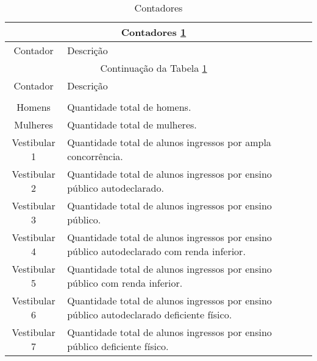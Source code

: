 \documentclass[cic,tc]{iiufrgs}
\begin{document}
    \begin{longtable}[c]{|c|p{10cm}|p{2cm}|}
    \caption{Contadores \label{tabContadores}}\\

    \hline
    \multicolumn{2}{|c|}{Contadores \ref{tabContadores}}\\
    \hline
    Contador & Descrição\\
    \hline
    \endfirsthead
    
    \hline
    \multicolumn{2}{|c|}{Continuação da Tabela \ref{tabContadores}}\\
    \hline
    Contador & Descrição\\
    \hline
    \endhead
    
    \hline
    \endfoot
    
    \hline
    \multicolumn{2}{| c |}{Fim da Tabela \ref{tabContadores}}\\
    \hline\hline
    \endlastfoot
    
        Homens &   
        Quantidade total de homens. \\ \hline 
        
        Mulheres &   
        Quantidade total de mulheres. \\ \hline 
        
        Vestibular 1 &   
        Quantidade total de alunos ingressos por ampla concorrência. \\ \hline 
        
        Vestibular 2 &   
        Quantidade total de alunos ingressos por ensino público autodeclarado. \\ \hline
        
        Vestibular 3 &   
        Quantidade total de alunos ingressos por ensino público. \\ \hline 
        
        Vestibular 4 &   
        Quantidade total de alunos ingressos por ensino público autodeclarado com renda inferior. \\ \hline
        
        Vestibular 5 &   
        Quantidade total de alunos ingressos por ensino público com renda inferior. \\ \hline 
        
        
        Vestibular 6 &   
        Quantidade total de alunos ingressos por ensino público autodeclarado deficiente físico. \\ \hline
        
        Vestibular 7 &   
        Quantidade total de alunos ingressos por ensino público deficiente físico. \\ \hline 
        

\end{longtable}
\end{document}
